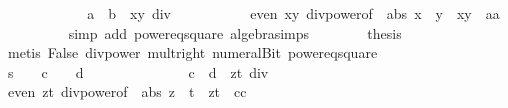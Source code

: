 \begin{isabellebody}
\ \ \ \ \isamarkupfalse%
{\isacharminus}\isanewline
\ \ \ \ \ \ \isamarkupfalse%
\ {\isachardoublequoteopen}a{\isacharcircum}{}\ {\isacharplus}\ {\isacharquery}b{\isacharcircum}{}\ {\isacharequal}\ {\isacharparenleft}x{\isacharplus}y{\isacharparenright}{\isacharcircum}{}\ div\ {}{\isachardoublequoteclose}\isanewline
\ \ \ \ \ \ \ \ \isamarkupfalse%
\ {\isacharbackquoteopen}even\ {\isacharparenleft}x{\isacharplus}y{\isacharparenright}{\isacharbackquoteclose}\ div{\isacharunderscore}power{\isacharbrackleft}of\ {}\ {\isachardoublequoteopen}abs\ {\isacharparenleft}x\ {\isacharminus}\ y{\isacharparenright}{\isachardoublequoteclose}\ {}{\isacharbrackright}\ {\isacharbackquoteopen}x{\isacharasterisk}y\ {\isacharequal}\ a{\isacharasterisk}a{\isacharbackquoteclose}\isanewline
\ \ \ \ \ \ \ \ \isamarkupfalse%
\ {\isacharparenleft}simp\ add{\isacharcolon}\ power{}{\isacharunderscore}eq{\isacharunderscore}square\ algebra{\isacharunderscore}simps{\isacharparenright}\isanewline
\ \ \ \ \ \ \isamarkupfalse%
\ {\isacharquery}thesis\isanewline
\ \ \ \ \ \ \ \ \isamarkupfalse%
\ {\isacharparenleft}metis\ False\ div{\isacharunderscore}power\ mult{\isacharunderscore}{}{\isacharunderscore}right\ numeral{\isacharunderscore}Bit{}\ power{}{\isacharunderscore}eq{\isacharunderscore}square{\isacharparenright}\isanewline
\ \ \ \ \isamarkupfalse%
\isanewline
\isanewline
\ \ \ \ \isamarkupfalse%
\ {\isachardoublequoteopen}{\isacharquery}s\ {\isacharcircum}\ {}\ {\isacharequal}\ c\ {\isacharcircum}\ {}\ {\isacharplus}\ {\isacharquery}d\ {\isacharcircum}\ {}{\isachardoublequoteclose}\isanewline
\ \ \ \ \isamarkupfalse%
{\isacharminus}\isanewline
\ \ \ \ \ \ \isamarkupfalse%
\ {\isachardoublequoteopen}c{\isacharcircum}{}\ {\isacharplus}\ {\isacharquery}d{\isacharcircum}{}\ {\isacharequal}\ {\isacharparenleft}z{\isacharplus}t{\isacharparenright}{\isacharcircum}{}\ div\ {}{\isachardoublequoteclose}\isanewline
\ \ \ \ \ \ \ \ \isamarkupfalse%
\ {\isacharbackquoteopen}even\ {\isacharparenleft}z{\isacharplus}t{\isacharparenright}{\isacharbackquoteclose}\ div{\isacharunderscore}power{\isacharbrackleft}of\ {}\ {\isachardoublequoteopen}abs\ {\isacharparenleft}z\ {\isacharminus}\ t{\isacharparenright}{\isachardoublequoteclose}\ {}{\isacharbrackright}\ {\isacharbackquoteopen}z{\isacharasterisk}t\ {\isacharequal}\ c{\isacharasterisk}c{\isacharbackquoteclose}\isanewline

\end{isabellebody}
